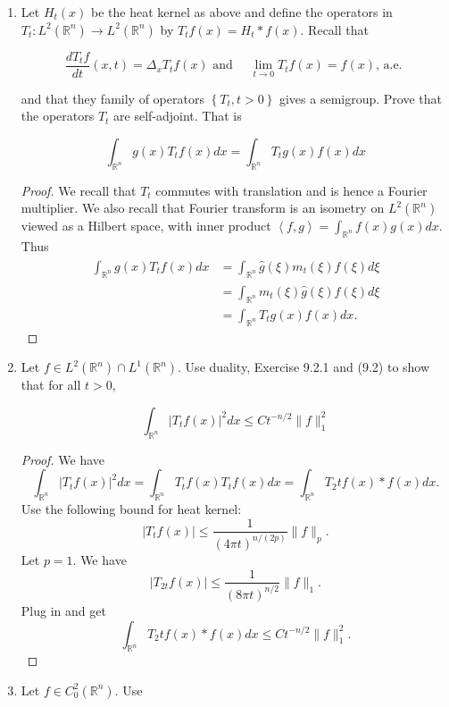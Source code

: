 \begin{enumerate}
\item 
Let $H_t(x)$ be the heat kernel as above and define the operators in $T_t: L^2\left(\mathbb{R}^n\right) \rightarrow L^2\left(\mathbb{R}^n\right)$ by $T_t f(x)=H_t * f(x)$. Recall that

\[
\frac{d T_t f}{d t}(x, t)=\Delta_x T_t f(x) \text { and } \quad \lim _{t \rightarrow 0} T_t f(x)=f(x) \text {, a.e. }
\]

and that they family of operators $\left\{T_t, t>0\right\}$ gives a semigroup. Prove that the operators $T_t$ are self-adjoint. That is

\[
\int_{\mathbb{R}^n} g(x) T_t f(x) d x=\int_{\mathbb{R}^n} T_{t }g(x) f(x) d x
\]
\begin{proof}
	We recall that $T_t$ commutes with translation and is hence a Fourier multiplier. We also recall that Fourier transform is an isometry on $L^2(\mathbb{R}^n)$ viewed as a Hilbert space, with inner product $\left\langle f, g \right\rangle = \int _{\mathbb{R}^n} f(x) g(x) dx$. Thus
	\begin{align*}
		\int _{\mathbb{R}^n} g(x) T_t f(x) dx
		&= \int _{\mathbb{R}^n} \hat{g} (\xi) m_t(\xi) \hat{f} (\xi) d \xi \\
		&= \int _{\mathbb{R}^n} m_t(\xi)\hat{g} (\xi)  \hat{f} (\xi) d \xi \\
		&=  \int _{\mathbb{R}^n} T_t g(x) f(x) dx
	.\end{align*}
\end{proof}

\item
Let $f \in L^2\left(\mathbb{R}^n\right) \cap L^1\left(\mathbb{R}^n\right)$. Use duality, Exercise 9.2.1 and (9.2) to show that for all $t>0$,

\[
\int_{\mathbb{R}^n}\left|T_t f(x)\right|^2 d x \leq C t^{-n / 2}\|f\|_1^2
\]

\begin{proof}
	We have
	\[
		\int _{\mathbb{R}^n} \left| T_t f(x) \right| ^2 dx
		= \int _{\mathbb{R}^n} T_t f(x) T_t f(x) dx
		= \int _{\mathbb{R}^n} T_2t f(x) * f(x) dx
	.\] 
	Use the following bound for heat kernel:
	\[
		|T_t f(x)| \le \frac{1}{\left( 4 \pi t \right) ^{n / (2 p)} }\|f\|_p
	.\] 
	Let $p = 1$. We have
	\[
		\left| T_{2 t} f(x) \right| \le \frac{1}{(8 \pi t)^{n / 2}} \|f\|_1
	.\] 
	Plug in and get
	\[
		\int _{\mathbb{R}^n} T_2t f(x) * f(x) dx
		\le C t^{- n / 2} \|f\|_1^2
	.\] 
\end{proof}

\item 
	Let $f \in C_0^2\left(\mathbb{R}^n\right)$. Use


\end{enumerate}
